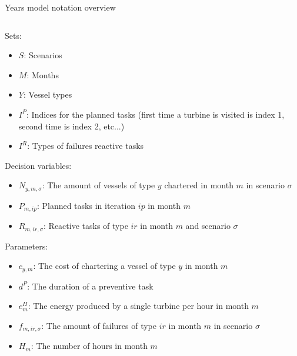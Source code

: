 \documentclass{beamer}
\newcommand{\smalld}{\tiny}
\begin{document}
\begin{frame}{Years model notation overview}
\smalld
\begin{columns}
\begin{column}{.48\textwidth}
Sets:
\begin{itemize}
\item $S$: Scenarios
\item $M$: Months
\item $Y$: Vessel types
\item $I^P$: Indices for the planned tasks (first time a turbine is visited is index 1, second time is index 2, etc...)
\item $I^R$: Types of failures reactive tasks
\end{itemize}

Decision variables:
\begin{itemize}
\item $N_{y,m,\sigma}$: The amount of vessels of type $y$ chartered in month $m$ in scenario $\sigma$
\item $P_{m,ip}$: Planned tasks in iteration $ip$ in month $m$
\item $R_{m,ir,\sigma}$: Reactive tasks of type $ir$ in month $m$ and scenario $\sigma$
\end{itemize}

Parameters:
\begin{itemize}
\item $c_{y,m}$: The cost of chartering a vessel of type $y$ in month $m$
\item $d^P$: The duration of a preventive task
\item $e^H_m$: The energy produced by a single turbine per hour in month $m$
\item $f_{m,ir,\sigma}$: The amount of failures of type $ir$ in month $m$ in scenario $\sigma$
\item $H_m$: The number of hours in month $m$
\end{itemize}
\end{column}

\hfill


\end{columns}
\end{frame}
\end{document}
